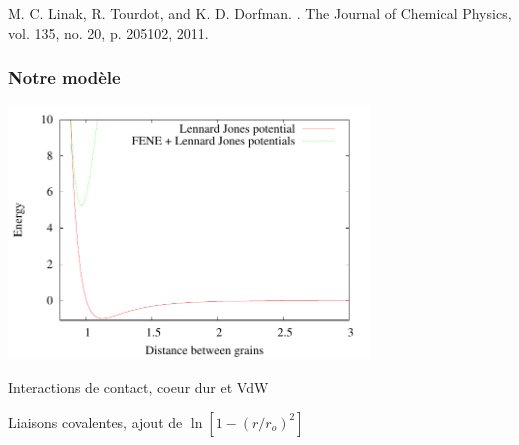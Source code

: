 \documentclass{beamer}
\begin{document}
{\begin{columns}
\end{columns}
\medskip


\vfill
{\tiny

\usebibitemtemplate{\color{structure}\insertbiblabel} 
\usebibliographyblocktemplate{\color{structure}}{\color{black}}{\color{structure!75}}{\color{structure!75}} 

\begin{thebibliography}{} 
M. C. Linak, R. Tourdot, and K. D. Dorfman. 
. 
\newblock The Journal of Chemical Physics, vol. 135, no. 20, p. 205102, 2011.
 

\end{thebibliography} }
}


\frame %
{
  \frametitle{Notre modèle}
 
\begin{center}

\includegraphics[width=0.72\textwidth]{potentials.pdf}


\begin{itemize}
\begin{center}
\item<2-> Interactions de contact, coeur dur et VdW
\medskip


 \item<3-> Liaisons covalentes, ajout de $\ln\left[1-(r/r_o)^2\right]$
 \medskip

 \end{center}
\end{itemize}
\end{center}
}
\end{document}

